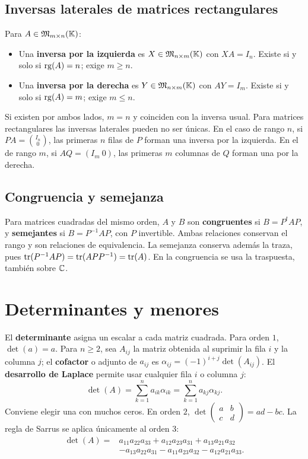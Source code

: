 \subsection*{Inversas laterales de matrices rectangulares}

Para $A\in\mathfrak{M}_{m\times n}(\mathbb{K})$:
\begin{itemize}
 \item Una \textbf{inversa por la izquierda} es $X\in\mathfrak{M}_{n\times m}(\mathbb{K})$
       con $XA=I_n$. Existe si y solo si $\operatorname{rg}(A)=n$; exige $m\ge n$.
 \item Una \textbf{inversa por la derecha} es $Y\in\mathfrak{M}_{n\times m}(\mathbb{K})$
       con $AY=I_m$. Existe si y solo si $\operatorname{rg}(A)=m$; exige $m\le n$.
\end{itemize}
Si existen por ambos lados, $m=n$ y coinciden con la inversa usual.
Para matrices rectangulares las inversas laterales pueden no ser únicas.
En el caso de rango $n$, si $PA=\binom{I_n}{0}$, las primeras $n$ filas
de $P$ forman una inversa por la izquierda. En el de rango $m$, si
$AQ=(I_m\ 0)$, las primeras $m$ columnas de $Q$ forman una por la derecha.

\subsection*{Congruencia y semejanza}

Para matrices cuadradas del mismo orden, $A$ y $B$ son
\textbf{congruentes} si $B=P^tAP$, y \textbf{semejantes} si
$B=P^{-1}AP$, con $P$ invertible. Ambas relaciones conservan el rango
y son relaciones de equivalencia. La semejanza conserva además la traza,
pues $\operatorname{tr}(P^{-1}AP)=\operatorname{tr}(APP^{-1})=\operatorname{tr}(A)$.
En la congruencia se usa la traspuesta, también sobre $\mathbb{C}$.

\section{Determinantes y menores}
\label{sec:determinantes}

El \textbf{determinante} asigna un escalar a cada matriz cuadrada.
Para orden $1$, $\det(a)=a$. Para $n\ge2$, sea $A_{ij}$ la matriz
obtenida al suprimir la fila $i$ y la columna $j$; el \textbf{cofactor}
o adjunto de $a_{ij}$ es $\alpha_{ij}=(-1)^{i+j}\det(A_{ij})$.
El \textbf{desarrollo de Laplace} permite usar cualquier fila $i$
o columna $j$:
\[
 \det(A)=\sum_{k=1}^n a_{ik}\alpha_{ik}
         =\sum_{k=1}^n a_{kj}\alpha_{kj}.
\]
Conviene elegir una con muchos ceros. En orden $2$,
$\det\begin{pmatrix}a&b\\c&d\end{pmatrix}=ad-bc$.
La regla de Sarrus se aplica únicamente al orden $3$:
\[
 \begin{split}
 \det(A)={}&a_{11}a_{22}a_{33}+a_{12}a_{23}a_{31}+a_{13}a_{21}a_{32}\\
 &-a_{13}a_{22}a_{31}-a_{11}a_{23}a_{32}-a_{12}a_{21}a_{33}.
 \end{split}
\]

